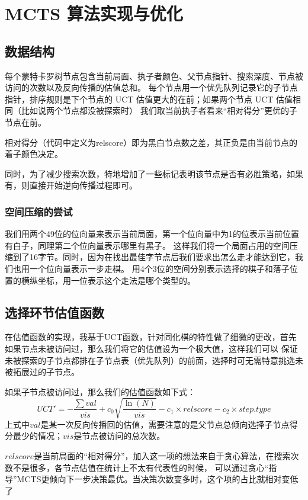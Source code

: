 \documentclass[12pt]{ctexart}
\begin{document}
	\section{MCTS 算法实现与优化}

	\subsection{数据结构}
	每个蒙特卡罗树节点包含当前局面、执子者颜色、父节点指针、搜索深度、节点被访问的次数以及反向传播的估值总和。
	每个节点用一个优先队列记录它的子节点指针，排序规则是下个节点的 UCT 估值更大的在前；如果两个节点 UCT 估值相同（比如说两个节点都没被探索时）
	我们取当前执子者看来“相对得分”更优的子节点在前。

	相对得分（代码中定义为\textsf{relscore}）即为黑白节点数之差，其正负是由当前节点的着子颜色决定。

	同时，为了减少搜索次数，特地增加了一些标记表明该节点是否有必胜策略，如果有，则直接开始逆向传播过程即可。

	\subsubsection*{空间压缩的尝试}
	我们用两个49位的位向量来表示当前局面，第一个位向量中为1的位表示当前位置有白子，同理第二个位向量表示哪里有黑子。
	这样我们将一个局面占用的空间压缩到了16字节。同时，因为在找出最佳字节点后我们要求出怎么走才能达到它，我们也用一个位向量表示一步走棋。
	用4个3位的空间分别表示选择的棋子和落子位置的横纵坐标，用一位表示这个走法是哪个类型的。

	\subsection{选择环节估值函数}
	在估值函数的实现，我基于UCT函数，针对同化棋的特性做了细微的更改，首先如果节点未被访问过，那么我们将它的估值设为一个极大值，这样我们可以
	保证未被探索的子节点都排在子节点表（优先队列）的前面，选择时可无需特意挑选未被拓展过的子节点。

	如果子节点被访问过，那么我们的估值函数如下式：
	\[UCT'= - \frac{\sum val}{vis} + c_0\sqrt{\frac{\ln(N)}{vis} }- c_1\times relscore - c_2\times step.type\]
	上式中$val$是某一次反向传播回的估值，需要注意的是父节点总倾向选择子节点得分最少的情况；$vis$是节点被访问的总次数。

	$relscore$是当前局面的“相对得分”，加入这一项的想法来自于贪心算法，在搜索次数不是很多，各节点估值在统计上不太有代表性的时候，
	可以通过贪心“指导”MCTS更倾向下一步决策最优。当决策次数变多时，这个项的占比就相对变低了
\end{document}
